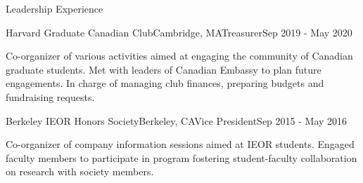 \documentclass{resume} %
\begin{document}



\begin{rSection}{Leadership Experience}

\begin{rSubsection}{Harvard Graduate Canadian Club}{Cambridge, MA}{Treasurer}{Sep 2019 - May 2020}

\item Co-organizer of various activities aimed at engaging the community of Canadian graduate students. Met with leaders of Canadian Embassy to plan future engagements. In charge of managing club finances, preparing budgets and fundraising requests.  

\end{rSubsection}

\begin{rSubsection}{Berkeley IEOR Honors Society}{Berkeley, CA}{Vice President}{Sep 2015 - May 2016}

\item Co-organizer of company information sessions aimed at IEOR students. Engaged faculty members to participate in program fostering student-faculty collaboration on research with society members.

\end{rSubsection}

\end{rSection}


\end{document}
